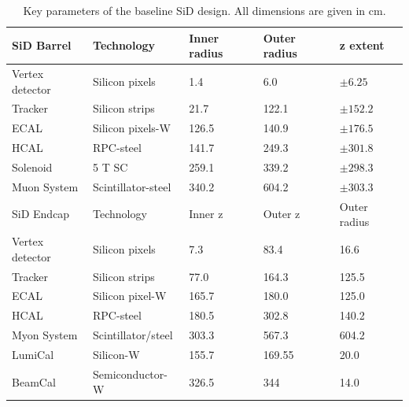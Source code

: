 \begin{table}
\caption{Key parameters of the baseline SiD design. All dimensions are given in cm.\cite{SiDBkgNote}}
\label{tab:KeyParametersSiD}
\centering
\begin{tabularx}{0.81\textwidth}{l|llll}
\hline\hline
SiD Barrel & Technology & Inner radius & Outer radius & z extent\\
\hline
Vertex detector & Silicon pixels & 1.4 & 6.0 & $\pm 6.25$ \\
Tracker & Silicon strips & 21.7 & 122.1 & $\pm 152.2$ \\
ECAL & Silicon pixels-W & 126.5 & 140.9 & $\pm 176.5$ \\
HCAL & RPC-steel & 141.7 & 249.3 & $\pm 301.8$ \\
Solenoid & 5 T SC & 259.1 & 339.2 & $\pm 298.3$ \\
Muon System & Scintillator-steel & 340.2 & 604.2 & $\pm 303.3$ \\
\hline
SiD Endcap & Technology & Inner z & Outer z & Outer radius\\
\hline
Vertex detector & Silicon pixels & 7.3 & 83.4 & 16.6 \\
Tracker & Silicon strips & 77.0 & 164.3 & 125.5 \\
ECAL & Silicon pixel-W & 165.7 & 180.0 & 125.0 \\
HCAL & RPC-steel & 180.5 & 302.8 & 140.2 \\
Myon System & Scintillator/steel & 303.3 & 567.3 & 604.2 \\
LumiCal & Silicon-W & 155.7 & 169.55 &  20.0 \\
BeamCal & Semiconductor-W & 326.5 & 344 & 14.0 \\
\hline\hline
\end{tabularx}
\end{table}

